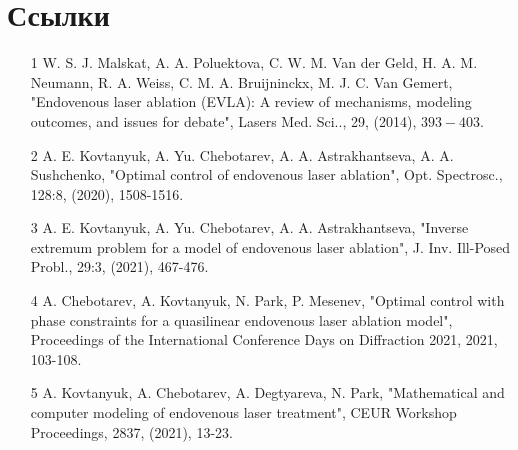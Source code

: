\documentclass[10pt]{article}
\begin{document}
    \section{Ссылки}
    \begin{enumerate}
        \item [1] W. S. J. Malskat, A. A. Poluektova, C. W. M. Van der Geld, H. A. M. Neumann, R. A. Weiss, C. M. A. Bruijninckx, M. J. C. Van Gemert, "Endovenous laser ablation (EVLA): A review of mechanisms, modeling outcomes, and issues for debate", Lasers Med. Sci.., 29, (2014), $393-403$.

        \item [2] A. E. Kovtanyuk, A. Yu. Chebotarev, A. A. Astrakhantseva, A. A. Sushchenko, "Optimal control of endovenous laser ablation", Opt. Spectrosc., 128:8, (2020), 1508-1516.

        \item [3] A. E. Kovtanyuk, A. Yu. Chebotarev, A. A. Astrakhantseva, "Inverse extremum problem for a model of endovenous laser ablation", J. Inv. Ill-Posed Probl., 29:3, (2021), 467-476.

        \item [4] A. Chebotarev, A. Kovtanyuk, N. Park, P. Mesenev, "Optimal control with phase constraints for a quasilinear endovenous laser ablation model", Proceedings of the International Conference Days on Diffraction 2021, 2021, 103-108.

        \item [5] A. Kovtanyuk, A. Chebotarev, A. Degtyareva, N. Park, "Mathematical and computer modeling of endovenous laser treatment", CEUR Workshop Proceedings, 2837, (2021), 13-23.
    \end{enumerate}
\end{document}
